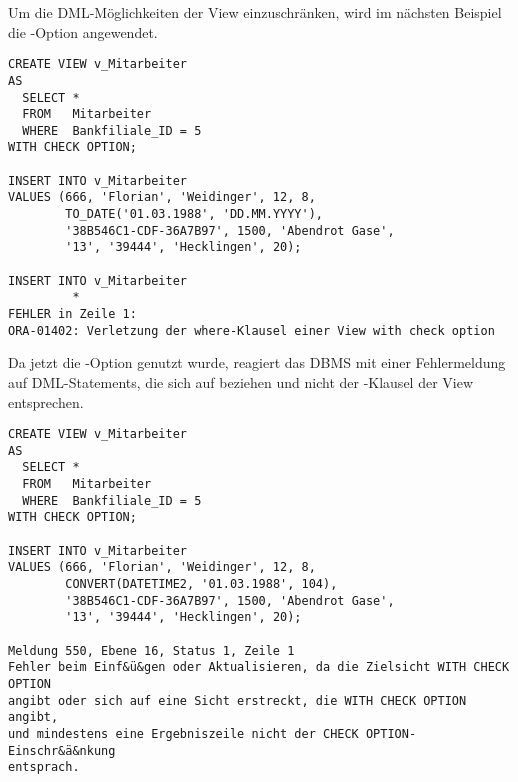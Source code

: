           Um die DML-Möglichkeiten der View  einzuschränken, wird im nächsten Beispiel die -Option angewendet.
          \begin{lstlisting}[language=oracle_sql,caption={Ein Experiment mit der CHECK OPTION in Oracle},label=sql08_36]
CREATE VIEW v_Mitarbeiter
AS
  SELECT *
  FROM   Mitarbeiter
  WHERE  Bankfiliale_ID = 5
WITH CHECK OPTION;

INSERT INTO v_Mitarbeiter
VALUES (666, 'Florian', 'Weidinger', 12, 8,
        TO_DATE('01.03.1988', 'DD.MM.YYYY'),
        '38B546C1-CDF-36A7B97', 1500, 'Abendrot Gase',
        '13', '39444', 'Hecklingen', 20);

INSERT INTO v_Mitarbeiter
         *
FEHLER in Zeile 1:
ORA-01402: Verletzung der where-Klausel einer View with check option
          \end{lstlisting}
          Da jetzt die -Option genutzt wurde, reagiert das DBMS mit einer Fehlermeldung auf DML-Statements, die sich auf  beziehen und nicht der \WHERE-Klausel der View entsprechen.
          \begin{lstlisting}[language=ms_sql,caption={Ein Experiment mit der CHECK OPTION in SQL Server},label=sql08_37]
CREATE VIEW v_Mitarbeiter
AS
  SELECT *
  FROM   Mitarbeiter
  WHERE  Bankfiliale_ID = 5
WITH CHECK OPTION;

INSERT INTO v_Mitarbeiter
VALUES (666, 'Florian', 'Weidinger', 12, 8,
        CONVERT(DATETIME2, '01.03.1988', 104),
        '38B546C1-CDF-36A7B97', 1500, 'Abendrot Gase',
        '13', '39444', 'Hecklingen', 20);

Meldung 550, Ebene 16, Status 1, Zeile 1
Fehler beim Einf&ü&gen oder Aktualisieren, da die Zielsicht WITH CHECK OPTION
angibt oder sich auf eine Sicht erstreckt, die WITH CHECK OPTION angibt,
und mindestens eine Ergebniszeile nicht der CHECK OPTION-Einschr&ä&nkung
entsprach.
          \end{lstlisting}
